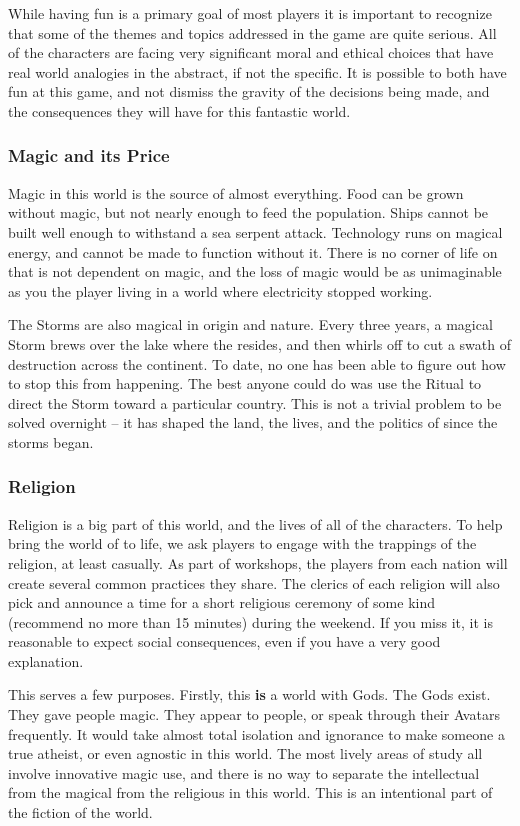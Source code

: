 \documentclass[sheet]{GL2020}
\begin{document}
While having fun is a primary goal of most players it is important to recognize that some of the themes and topics addressed in the game are quite serious. All of the characters are facing very significant moral and ethical choices that have real world analogies in the abstract, if not the specific. It is possible to both have fun at this game, and not dismiss the gravity of the decisions being made, and the consequences they will have for this fantastic world.

\subsubsection{Magic and its Price}
Magic in this world is the source of almost everything. Food can be grown without magic, but not nearly enough to feed the population. Ships cannot be built well enough to withstand a sea serpent attack. Technology runs on magical energy, and cannot be made to function without it. There is no corner of life on \pEarth{} that is not dependent on magic, and the loss of magic would be as unimaginable as you the player living in a world where electricity stopped working.

The Storms are also magical in origin and nature. Every three years, a magical Storm brews over the lake where the \pSc{} resides, and then whirls off to cut a swath of destruction across the continent. To date, no one has been able to figure out how to stop this from happening. The best anyone could do was use the Ritual to direct the Storm toward a particular country. This is not a trivial problem to be solved overnight -- it has shaped the land, the lives, and the politics of \pEarth{} since the storms began.

\subsubsection{Religion}
Religion is a big part of this world, and the lives of all of the characters. To help bring the world of \pEarth{} to life, we ask players to engage with the trappings of the religion, at least casually. As part of workshops, the players from each nation will create several common practices they share. The clerics of each religion will also pick and announce a time for a short religious ceremony of some kind (recommend no more than 15 minutes) during the weekend. If you miss it, it is reasonable to expect social consequences, even if you have a very good explanation.

This serves a few purposes. Firstly, this \textbf{is} a world with Gods. The Gods exist. They gave people magic. They appear to people, or speak through their Avatars frequently. It would take almost total isolation and ignorance to make someone a true atheist, or even agnostic in this world. The most lively areas of study all involve innovative magic use, and there is no way to separate the intellectual from the magical from the religious in this world. This is an intentional part of the fiction of the world. 
\end{document}
